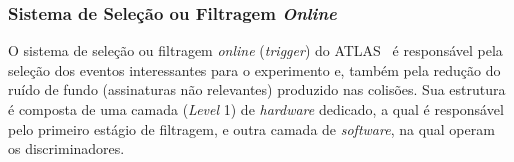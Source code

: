 
\subsubsection{Sistema de Seleção ou Filtragem \textit{Online}}

O sistema de seleção ou filtragem \emph{online} (\emph{trigger}) do ATLAS~\cite{Achenbach2008} é responsável pela seleção dos eventos interessantes para o experimento e, também pela redução do ruído de fundo (assinaturas não relevantes) produzido nas colisões. Sua estrutura é composta de uma camada (\textit{Level} 1) de \textit{hardware} dedicado, a qual é responsável pelo primeiro estágio de filtragem, e outra camada de \textit{software}, na qual operam os discriminadores.

%

